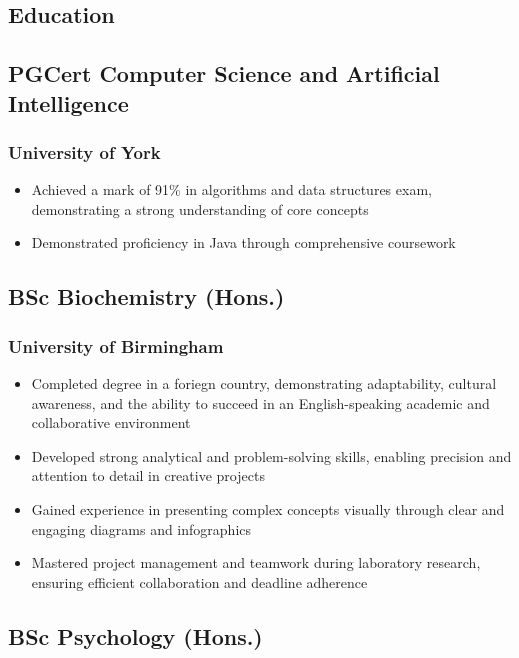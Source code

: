 \documentclass{article}
\begin{document}
\begin{paracol}{2}
  \section{Education}
  \subsection{PGCert Computer Science and Artificial Intelligence}
  \subsubsection{University of York}
  \hspace*{\fill}{\small Awarded 2023}
  \begin{itemize}[leftmargin=*]
    \setlength\itemsep{-2pt}
    \item Achieved a mark of 91\% in algorithms and data structures exam, demonstrating a strong understanding of core concepts
    \item Demonstrated proficiency in Java through comprehensive coursework
  \end{itemize}

  \subsection{BSc Biochemistry (Hons.)}
  \subsubsection{University of Birmingham}
  \hspace*{\fill}{\small Graduated 2019}
  \begin{itemize}[leftmargin=*]
    \setlength\itemsep{-2pt}
    \item Completed degree in a foriegn country, demonstrating adaptability, cultural awareness, and the ability to succeed in an English-speaking academic and collaborative environment
    \item Developed strong analytical and problem-solving skills, enabling precision and attention to detail in creative projects
    \item Gained experience in presenting complex concepts visually through clear and engaging diagrams and infographics
    \item Mastered project management and teamwork during laboratory research, ensuring efficient collaboration and deadline adherence
  \end{itemize}

  \subsection{BSc Psychology (Hons.)}

\end{paracol}
\end{document}
